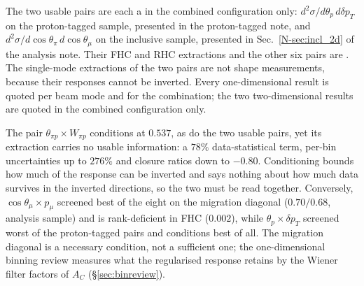 \documentclass[11pt,a4paper]{article}
\newcommand{\noteref}[2]{#1~\ref{N-#2} of the analysis note}
\begin{document}
The two usable pairs are each a \statSecondary{} in the combined configuration only:
$d^2\sigma/d\theta_p\,d\delta p_T$ on the proton-tagged sample, presented in the proton-tagged note,
and $d^2\sigma/d\cos\theta_\pi\,d\cos\theta_\mu$ on the inclusive sample, presented in
\noteref{Sec.}{sec:incl_2d}. Their FHC and RHC extractions and the other six pairs are
\statNotReported{}. The single-mode extractions
of the two pairs are not shape measurements, because their responses cannot be inverted. Every
one-dimensional result is quoted per beam mode and for the combination; the two two-dimensional
results are quoted in the combined configuration only.

The pair $\theta_{\pi p}\times W_{\pi p}$ conditions at $0.537$, as do the two usable pairs, yet
its extraction carries no usable information: a $78\%$ data-statistical term, per-bin uncertainties up
to $276\%$ and closure ratios down to $-0.80$. Conditioning bounds how much of the response can be
inverted and says nothing about how much data survives in the inverted directions, so the two must be
read together. Conversely, $\cos\theta_\mu\times p_\mu$ screened best of the eight on the migration
diagonal ($0.70/0.68$, analysis sample) and is rank-deficient in FHC ($0.002$), while
$\theta_p\times\delta p_T$ screened worst of the proton-tagged pairs and conditions best of all. The
migration diagonal is a necessary condition, not a sufficient one; the one-dimensional binning review
measures what the regularised response retains by the Wiener filter factors of $A_C$
(\S\ref{sec:binreview}).
\end{document}
